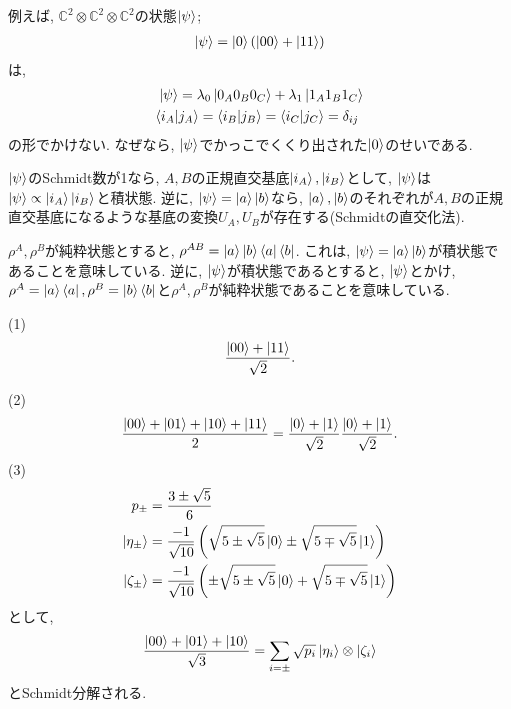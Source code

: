 \begin{ex}
    \label{ex2.77}
    例えば, $\mathbb{C}^2 \otimes \mathbb{C}^2 \otimes \mathbb{C}^2$の状態$\ket{\psi}$;
    \begin{align*}
        \ket{\psi}= \ket{0} \left( {\ket{00} + \ket{11}}\right)
    \end{align*}
    は,
    \begin{align*}
        \ket{\psi}
        =
        \lambda_0 \ket{0_{A}{0_{B}}{0_{C}}}
        +
        \lambda_1 \ket{1_{A}{1_{B}}{1_{C}} } \\
        \braket{i_{A} | j_{A}} = \braket{i_{B} | j_{B}} = \braket{i_{C} | j_{C}} = \delta_{ij} \
    \end{align*}
    の形でかけない. なぜなら, $\ket{\psi}$でかっこでくくり出された$\ket{0}$のせいである.
\end{ex}

\begin{ex}
    \label{ex2.78}
    $\ket{\psi}$のSchmidt数が1なら, $A,B$の正規直交基底$\ket{i_A}, \ket{i_B}$として, $\ket{\psi}$は$\ket{ \psi } \propto \ket{i_A} \ket{i_B}$と積状態.
    逆に, $\ket{ \psi } = \ket{a} \ket{b}$なら, $\ket{a}, \ket{b}$のそれぞれが$A,B$の正規直交基底になるような基底の変換$U_A,U_B$が存在する(Schmidtの直交化法).
    \par
    $\rho^A, \rho^B$が純粋状態とすると, $\rho^{AB} = \ket{a}\ket{b} \bra{a}\bra{b}$. これは, $\ket{\psi}=\ket{a}\ket{b}$が積状態であることを意味している. 逆に, $\ket{\psi}$が積状態であるとすると, $\ket{\psi}$とかけ, $\rho^A = \ket{a} \bra{a}, \rho^B = \ket{b} \bra{b}$と$\rho^A, \rho^B$が純粋状態であることを意味している.
\end{ex}

\begin{ex}
    \label{ex2.79}
    (1)\
    \begin{align*}
        \frac{\ket{00} + \ket{11}}{\sqrt{2}}.
    \end{align*}
    \par
    (2)\
    \begin{align*}
        \frac{\ket{00}+\ket{01}+\ket{10}+\ket{11}}{2} = \frac{\ket{0} + \ket{1}}{\sqrt{2}} \frac{\ket{0} + \ket{1}}{\sqrt{2}} .
    \end{align*}
    (3)\
    \begin{align*}
        p_{\pm} &= \frac{3 \pm \sqrt{5}}{6} \\
        \ket{\eta_\pm} &= \frac{-1}{\sqrt{10}} 
        \left( 
            \sqrt{5 \pm \sqrt{5} } \ket{0}
            \pm
            \sqrt{5 \mp \sqrt{5} } \ket{1}
        \right) \\
        \ket{\zeta_\pm} &= \frac{-1}{\sqrt{10}} 
        \left( 
            \pm \sqrt{5 \pm \sqrt{5} } \ket{0}
            +
            \sqrt{5 \mp \sqrt{5} } \ket{1}
        \right)
    \end{align*}
    として, 
    \begin{align*}
        \frac{\ket{00}+\ket{01} + \ket{10}}{\sqrt{3}} =
        \sum_{i = \pm} \sqrt{p_i} \ket{\eta_i} \otimes \ket{\zeta_i}
    \end{align*}
    とSchmidt分解される.
\end{ex}

